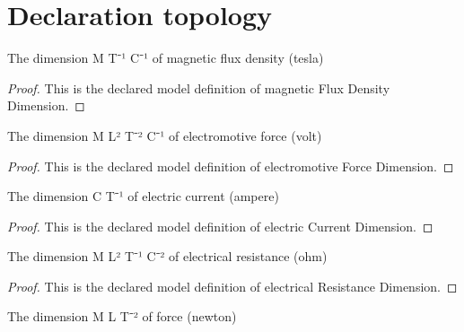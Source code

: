 \section{Declaration topology}
\begin{definition}
  \label{def:physics:phyx-mini-0937:phyxminiproblems-problemphyxmini0937-magneticfluxdensitydimension}
  The dimension M T⁻¹ C⁻¹ of magnetic flux density (tesla)
\end{definition}
\begin{proof}
  This is the declared model definition of magnetic Flux Density Dimension.
\end{proof}
\begin{definition}
  \label{def:physics:phyx-mini-0937:phyxminiproblems-problemphyxmini0937-electromotiveforcedimension}
  The dimension M L² T⁻² C⁻¹ of electromotive force (volt)
\end{definition}
\begin{proof}
  This is the declared model definition of electromotive Force Dimension.
\end{proof}
\begin{definition}
  \label{def:physics:phyx-mini-0937:phyxminiproblems-problemphyxmini0937-electriccurrentdimension}
  The dimension C T⁻¹ of electric current (ampere)
\end{definition}
\begin{proof}
  This is the declared model definition of electric Current Dimension.
\end{proof}
\begin{definition}
  \label{def:physics:phyx-mini-0937:phyxminiproblems-problemphyxmini0937-electricalresistancedimension}
  The dimension M L² T⁻¹ C⁻² of electrical resistance (ohm)
\end{definition}
\begin{proof}
  This is the declared model definition of electrical Resistance Dimension.
\end{proof}
\begin{definition}
  \label{def:physics:phyx-mini-0937:phyxminiproblems-problemphyxmini0937-forcedimension}
  The dimension M L T⁻² of force (newton)
\end{definition}
